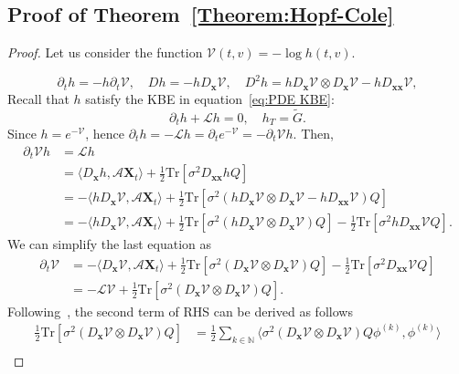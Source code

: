 \documentclass[nohyperref]{article}
\theoremstyle{plain}
\theoremstyle{remark}
\newcommand{\la}{\langle}
\newcommand{\ra}{\rangle}
\newcommand{\mc}{\mathcal}
\newcommand{\mb}{\mathbf}
\begin{document}
\subsection{Proof of Theorem~\ref{Theorem:Hopf-Cole}}
\begin{proof}
Let us consider the function $\mc{V}(t, v) = -\log h(t, v)$. 

\begin{equation}
    \partial_t h = -h \partial_t \mc{V}, \quad D h = -h D_{\mb{x}}\mc{V}, \quad D^2 h = h D_{\mb{x}}\mc{V} \otimes D_{\mb{x}}\mc{V} - h D_{\mb{xx}} \mc{V},
\end{equation}
Recall that $h$ satisfy the KBE in equation~\eqref{eq:PDE KBE}:
\begin{equation}
    \partial_t h + \mathcal{L} h = 0, \quad h_T = \tilde{G}.
\end{equation}
Since $h = e^{-\mc{V}}$, hence $\partial_t h = -\mathcal{L}h = \partial_t e^{-\mc{V}} = -\partial_t \mc{V} h$. Then,
\begin{align}
    \partial_t \mc{V} h &= \mathcal{L}h  \\
    & = \la D_{\mb{x}}h, \mc{A} \mb{X}_t \ra + \frac{1}{2}\text{Tr}\left[\sigma^2 D_{\mb{xx}} h Q \right] \\
    & = -\la h D_{\mb{x}}\mc{V}, \mc{A} \mb{X}_t  \ra  +\frac{1}{2}\text{Tr}\left[\sigma^2 \left( h D_{\mb{x}}\mc{V} \otimes D_{\mb{x}} \mc{V} - h D_{\mb{xx}} \mc{V}\right)Q \right] \\
    & = -\la h D_{\mb{x}}\mc{V}, \mc{A} \mb{X}_t  \ra +\frac{1}{2}\text{Tr}\left[\sigma^2 \left( h D_{\mb{x}} \mc{V} \otimes D_{\mb{x}} \mc{V}\right)Q\right] - \frac{1}{2}\text{Tr}\left[\sigma^2 h D_{\mb{xx}} \mc{V} Q\right].
\end{align}
We can simplify the last equation as  
\begin{align}
    \partial_t \mc{V} &= -\la D_{\mb{x}}\mc{V}, \mc{A} \mb{X}_t  \ra + \frac{1}{2}\text{Tr}\left[\sigma^2\left(D_{\mb{x}} \mc{V} \otimes D_{\mb{x}} \mc{V}\right)Q\right] - \frac{1}{2}\text{Tr}\left[\sigma^2 D_{\mb{xx}} \mc{V} Q\right] \\
    & = -\mathcal{L} \mc{V} + \frac{1}{2}\text{Tr}\left[\sigma^2\left(D_{\mb{x}} \mc{V}\otimes D_{\mb{x}} \mc{V}\right)Q\right].
\end{align}
Following~\citep{8618948}, the second term of RHS can be derived as follows
\begin{align}
    \frac{1}{2}\text{Tr}\left[\sigma^2\left(D_{\mb{x}} \mc{V}\otimes D_{\mb{x}} \mc{V}\right)Q\right] &= \frac{1}{2}\sum_{k \in \mathbb{N}} \la \sigma^2 (D_{\mb{x}} \mc{V} \otimes D_{\mb{x}}\mc{V}) Q \phi^{(k)}, \phi^{(k)}\ra\\

\end{align}
\end{proof}
\end{document}

